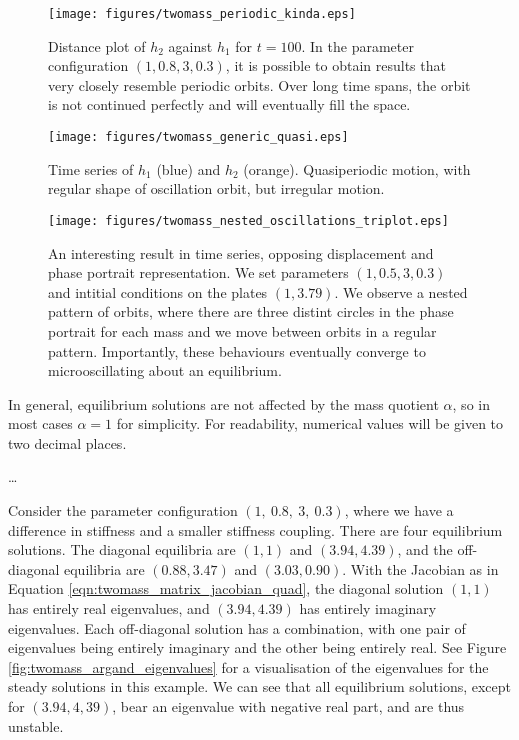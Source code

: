 \documentclass{article}
\begin{document}
\begin{figure}
    \centering
    \texttt{[image: figures/twomass\_periodic\_kinda.eps]}
    \caption{
        Distance plot of $h_2$ against $h_1$ for $t=100$.
        In the parameter configuration \((1,0.8,3,0.3)\), it is possible to obtain results that very closely resemble periodic orbits.
        Over long time spans, the orbit is not continued perfectly and will eventually fill the space.
    }
    \label{fig:twomass_semiperiodic}
\end{figure}

\begin{figure}
    \centering
    \texttt{[image: figures/twomass\_generic\_quasi.eps]}
    \caption{
        Time series of $h_1$ (blue) and $h_2$ (orange).
        Quasiperiodic motion, with regular shape of oscillation orbit,
        but irregular motion.
    }
    \label{fig:twomass_generic_quasi}
\end{figure}

\begin{figure}
    \centering
    \texttt{[image: figures/twomass\_nested\_oscillations\_triplot.eps]}
    \caption{
        An interesting result in time series, opposing displacement and phase portrait representation.
        We set parameters \((1,0.5,3,0.3)\) and intitial conditions on the plates \((1,3.79)\).
        We observe a nested pattern of orbits,
        where there are three distint circles in the phase portrait for each mass and we move between orbits in a regular pattern.
        Importantly, these behaviours eventually converge to microoscillating about an equilibrium.
    }
    \label{fig:twomass_nested_interesting_1}
\end{figure}

In general, equilibrium solutions are not affected by the mass quotient $\alpha$, so in most cases $\alpha = 1$ for simplicity.
For readability, numerical values will be given to two decimal places.

\dots


Consider the parameter configuration \((1,~0.8,~3,~0.3)\), where we have a difference in stiffness and a smaller stiffness coupling.
There are four equilibrium solutions.
The diagonal equilibria are \((1,1)\) and \((3.94,4.39)\),
and the off-diagonal equilibria are \((0.88,3.47)\) and \((3.03,0.90)\).
With the Jacobian as in Equation \ref{eqn:twomass_matrix_jacobian_quad},
the diagonal solution \((1,1)\) has entirely real eigenvalues, and \((3.94,4.39)\) has entirely imaginary eigenvalues.
Each off-diagonal solution has a combination, with one pair of eigenvalues being entirely imaginary and the other being entirely real.
See Figure \ref{fig:twomass_argand_eigenvalues} for a visualisation of the eigenvalues for the steady solutions in this example.
We can see that all equilibrium solutions, except for \((3.94,4,39)\), bear an eigenvalue with negative real part, and are thus unstable.
\end{document}
